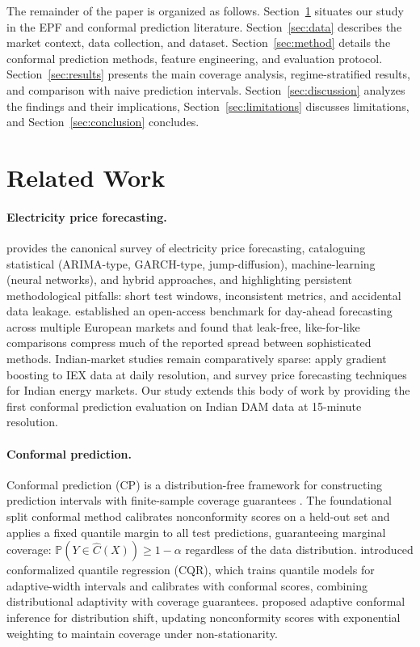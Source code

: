 \documentclass[preprint,12pt]{elsarticle}
\begin{document}
\begin{enumerate}
The remainder of the paper is organized as follows. Section~\ref{sec:related} situates our study in the EPF and conformal prediction literature. Section~\ref{sec:data} describes the market context, data collection, and dataset. Section~\ref{sec:method} details the conformal prediction methods, feature engineering, and evaluation protocol. Section~\ref{sec:results} presents the main coverage analysis, regime-stratified results, and comparison with naive prediction intervals. Section~\ref{sec:discussion} analyzes the findings and their implications, Section~\ref{sec:limitations} discusses limitations, and Section~\ref{sec:conclusion} concludes.

\section{Related Work}\label{sec:related}

\paragraph{Electricity price forecasting.}
\citet{weron2014} provides the canonical survey of electricity price forecasting, cataloguing statistical (ARIMA-type, GARCH-type, jump-diffusion), machine-learning (neural networks), and hybrid approaches, and highlighting persistent methodological pitfalls: short test windows, inconsistent metrics, and accidental data leakage. \citet{lago2021} established an open-access benchmark for day-ahead forecasting across multiple European markets and found that leak-free, like-for-like comparisons compress much of the reported spread between sophisticated methods. Indian-market studies remain comparatively sparse: \citet{kumar2022} apply gradient boosting to IEX data at daily resolution, and \citet{sharma2023} survey price forecasting techniques for Indian energy markets. Our study extends this body of work by providing the first conformal prediction evaluation on Indian DAM data at 15-minute resolution.

\paragraph{Conformal prediction.}
Conformal prediction (CP) is a distribution-free framework for constructing prediction intervals with finite-sample coverage guarantees \citep{vovk2005,vovk2011conformal}. The foundational split conformal method \citep{lei2018} calibrates nonconformity scores on a held-out set and applies a fixed quantile margin to all test predictions, guaranteeing marginal coverage: $\mathbb{P}(Y \in \hat{C}(X)) \ge 1-\alpha$ regardless of the data distribution. \citet{romano2019} introduced conformalized quantile regression (CQR), which trains quantile models for adaptive-width intervals and calibrates with conformal scores, combining distributional adaptivity with coverage guarantees. \citet{gibbs2021} proposed adaptive conformal inference for distribution shift, updating nonconformity scores with exponential weighting to maintain coverage under non-stationarity.


\end{enumerate}
\end{document}
